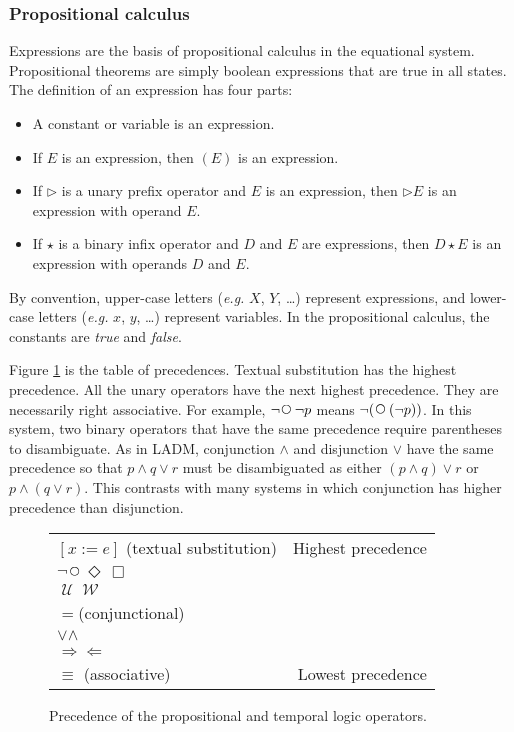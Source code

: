 \documentclass[12pt, fleqn, leqno]{article}
\newcommand{\impl}{\ensuremath{\Rightarrow}}        %
\newcommand{\foll}{\ensuremath{\Leftarrow}}         %
\newcommand{\Until}{\;\mathcal{U}\;}
\newcommand{\Wait}{\;\mathcal{W}\;}
\newcommand{\Next}{\;\,\text{\raisebox{3.5pt}{\circle{6}}}}
\newcommand{\Event}{\Diamond\,}
\newcommand{\Always}{\Box\,}
\begin{document}
\subsubsection*{Propositional calculus}

Expressions are the basis of propositional calculus in the equational system.
Propositional theorems are simply boolean expressions that are true in all states.
The definition of an expression has four parts:
\begin{itemize}[$\bullet$]
\item A constant or variable is an expression.
\item If $E$ is an expression, then $(E)$ is an expression.
\item If $\triangleright$ is a unary prefix operator and $E$ is an expression, then $\triangleright E$ is an expression with operand $E$.
\item If $\star$ is a binary infix operator and $D$ and $E$ are expressions, then $D \star E$ is an expression with operands $D$
and $E$.
\end{itemize}
By convention, upper-case letters ({\itshape e.g.\/} $X$, $Y$, \dots) represent expressions,
and lower-case letters ({\itshape e.g.\/} $x$, $y$, \dots) represent variables.
In the propositional calculus, the constants are {\itshape true\/} and {\itshape false\/}.

Figure \ref{precedence-table} is the table of precedences.
Textual substitution has the highest precedence.
All the unary operators have the next highest precedence.
They are necessarily right associative.
For example, $\neg \Next \neg p$ means $\neg (\Next (\neg p))$.
In this system, two binary operators that have the same precedence require parentheses to disambiguate.
As in LADM, conjunction $\land$ and disjunction $\lor$ have the same precedence so that $p\land q\lor r$
must be disambiguated as either $(p\land q)\lor r$ or $p\land (q\lor r)$.
This contrasts with many systems in which conjunction has higher precedence than disjunction.

\begin{figure}[t]
\centering
\setlength\extrarowheight{2pt}
\begin{tabular}{lr}
\hline
$[x := e]$ (textual substitution) & Highest precedence\\
$\neg$\quad $\Next$\quad $\Event$\quad $\Always$ &\\
$\Until$\quad $\Wait$ &\\
$=$\quad (conjunctional) &\\
$\lor$\quad $\land$ &\\
$\impl$\quad $\foll$ &\\
$\equiv$ \quad (associative) & Lowest precedence\\
\hline
\end{tabular}
\caption{Precedence of the propositional and temporal logic operators.
\label{precedence-table}}
\end{figure}
\end{document}
